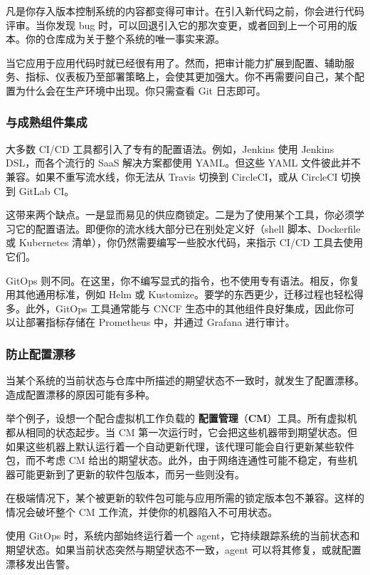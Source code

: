 \label{idx:2068}
凡是你存入版本控制系统的内容都变得可审计。在引入新代码之前，你会进行代码评审。当你发现 bug 时，可以回退引入它的那次变更，或者回到上一个可用的版本。你的仓库成为关于整个系统的唯一事实来源。

\label{idx:2069}
当它应用于应用代码时就已经很有用了。然而，把审计能力扩展到配置、辅助服务、指标、仪表板乃至部署策略上，会使其更加强大。你不再需要问自己，某个配置为什么会在生产环境中出现。你只需查看 Git 日志即可。

\subsubsection{与成熟组件集成}

\label{idx:2070}
大多数 CI/CD 工具都引入了专有的配置语法。例如，Jenkins 使用 Jenkins DSL，而各个流行的 SaaS 解决方案都使用 YAML。但这些 YAML 文件彼此并不兼容。如果不重写流水线，你无法从 Travis 切换到 CircleCI，或从 CircleCI 切换到 GitLab CI。

这带来两个缺点。一是显而易见的供应商锁定。二是为了使用某个工具，你必须学习它的配置语法。即便你的流水线大部分已在别处定义好（shell 脚本、Dockerfile 或 Kubernetes 清单），你仍然需要编写一些胶水代码，来指示 CI/CD 工具去使用它们。

GitOps 则不同。在这里，你不编写显式的指令，也不使用专有语法。相反，你复用其他通用标准，例如 Helm 或 Kustomize。要学的东西更少，迁移过程也轻松得多。此外，GitOps 工具通常能与 CNCF 生态中的其他组件良好集成，因此你可以让部署指标存储在 Prometheus 中，并通过 Grafana 进行审计。

\subsubsection{防止配置漂移}

\label{idx:2071}
当某个系统的当前状态与仓库中所描述的期望状态不一致时，就发生了配置漂移。造成配置漂移的原因可能有多种。

\label{idx:2072}
举个例子，设想一个配合虚拟机工作负载的 \textbf{配置管理}（\textbf{CM}）工具。所有虚拟机都从相同的状态起步。当 CM 第一次运行时，它会把这些机器带到期望状态。但如果这些机器上默认运行着一个自动更新代理，该代理可能会自行更新某些软件包，而不考虑 CM 给出的期望状态。此外，由于网络连通性可能不稳定，有些机器可能更新到了更新的软件包版本，而另一些则没有。

在极端情况下，某个被更新的软件包可能与应用所需的锁定版本包不兼容。这样的情况会破坏整个 CM 工作流，并使你的机器陷入不可用状态。

使用 GitOps 时，系统内部始终运行着一个 agent，它持续跟踪系统的当前状态和期望状态。如果当前状态突然与期望状态不一致，agent 可以将其修复，或就配置漂移发出告警。

